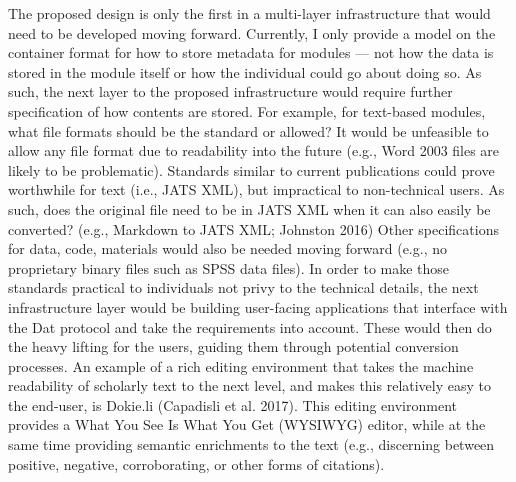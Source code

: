 \documentclass[a4paper]{article}
\begin{document}
The proposed design is only the first in a multi-layer infrastructure
that would need to be developed moving forward. Currently, I only
provide a model on the container format for how to store metadata for
modules --- not how the data is stored in the module itself or how the
individual could go about doing so. As such, the next layer to the
proposed infrastructure would require further specification of how
contents are stored. For example, for text-based modules, what file
formats should be the standard or allowed? It would be unfeasible to
allow any file format due to readability into the future (e.g., Word
2003 files are likely to be problematic). Standards similar to current
publications could prove worthwhile for text (i.e., JATS XML), but
impractical to non-technical users. As such, does the original file need
to be in JATS XML when it can also easily be converted? (e.g., Markdown
to JATS XML; Johnston 2016) Other specifications for data, code,
materials would also be needed moving forward (e.g., no proprietary
binary files such as SPSS data files). In order to make those standards
practical to individuals not privy to the technical details, the next
infrastructure layer would be building user-facing applications that
interface with the Dat protocol and take the requirements into account.
These would then do the heavy lifting for the users, guiding them
through potential conversion processes. An example of a rich editing
environment that takes the machine readability of scholarly text to the
next level, and makes this relatively easy to the end-user, is Dokie.li
(Capadisli et al. 2017). This editing environment provides a What You
See Is What You Get (WYSIWYG) editor, while at the same time providing
semantic enrichments to the text (e.g., discerning between positive,
negative, corroborating, or other forms of citations).
\end{document}
